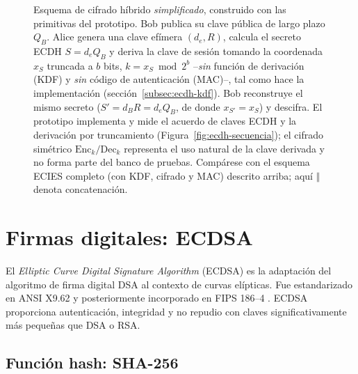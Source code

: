 \begin{figure}[htbp]
\caption{Esquema de cifrado híbrido \emph{simplificado}, construido con las primitivas del prototipo. Bob publica su clave pública de largo plazo $Q_B$. Alice genera una clave efímera $(d_e, R)$, calcula el secreto ECDH $S = d_e Q_B$ y deriva la clave de sesión tomando la coordenada $x_S$ truncada a $b$ bits, $k = x_S \bmod 2^{b}$ --\emph{sin} función de derivación (KDF) y \emph{sin} código de autenticación (MAC)--, tal como hace la implementación (sección~\ref{subsec:ecdh-kdf}). Bob reconstruye el mismo secreto ($S' = d_B R = d_e Q_B$, de donde $x_{S'} = x_S$) y descifra. El prototipo implementa y mide el acuerdo de claves ECDH y la derivación por truncamiento (Figura~\ref{fig:ecdh-secuencia}); el cifrado simétrico $\mathrm{Enc}_k / \mathrm{Dec}_k$ representa el uso natural de la clave derivada y no forma parte del banco de pruebas. Compárese con el esquema ECIES completo (con KDF, cifrado y MAC) descrito arriba; aquí $\Vert$ denota concatenación.}
\label{fig:ecies-simplificado}
\end{figure}


\section{Firmas digitales: ECDSA}
\label{sec:ecdsa}

El \emph{Elliptic Curve Digital Signature Algorithm} (ECDSA) es la adaptación del algoritmo de firma digital DSA al contexto de curvas elípticas. Fue estandarizado en ANSI X9.62 \cite{ansi-x962} y posteriormente incorporado en FIPS 186--4 \cite{nist-fips186-4}. ECDSA proporciona autenticación, integridad y no repudio con claves significativamente más pequeñas que DSA o RSA.


\subsection{Función hash: SHA-256}
\label{subsec:ecdsa-sha256}

